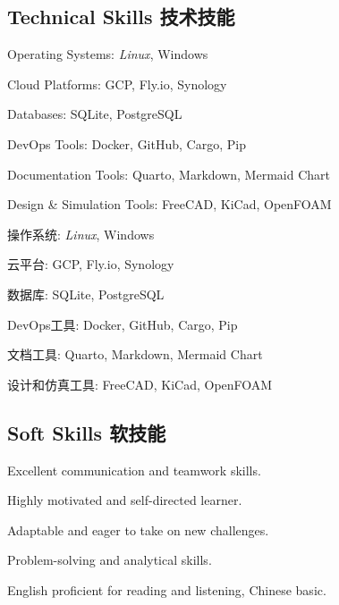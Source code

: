 \documentclass[
]
{article}
\providecommand{\tightlist}{%
  \setlength{\itemsep}{0pt}\setlength{\parskip}{0pt}}
\renewenvironment{itemize}{
  \begin{list}{}{
    \setlength{\leftmargin}{1.5em}
  }
}{
  \end{list}
}
\begin{document}
\subsection{Technical Skills \textbar{}
技术技能}\label{technical-skills-ux6280ux672fux6280ux80fd}

\begin{itemize}
\tightlist
\item
  Operating Systems: \emph{Linux}, Windows
\item
  Cloud Platforms: GCP, Fly.io, Synology
\item
  Databases: SQLite, PostgreSQL
\item
  DevOps Tools: Docker, GitHub, Cargo, Pip
\item
  Documentation Tools: Quarto, Markdown, Mermaid Chart
\item
  Design \& Simulation Tools: FreeCAD, KiCad, OpenFOAM
\end{itemize}

\begin{figure*}

\begin{itemize}
\tightlist
\item
  操作系统: \emph{Linux}, Windows
\item
  云平台: GCP, Fly.io, Synology
\item
  数据库: SQLite, PostgreSQL
\item
  DevOps工具: Docker, GitHub, Cargo, Pip
\item
  文档工具: Quarto, Markdown, Mermaid Chart
\item
  设计和仿真工具: FreeCAD, KiCad, OpenFOAM
\end{itemize}

\end{figure*}%

\subsection{Soft Skills \textbar{}
软技能}\label{soft-skills-ux8f6fux6280ux80fd}

\begin{itemize}
\tightlist
\item
  Excellent communication and teamwork skills.
\item
  Highly motivated and self-directed learner.
\item
  Adaptable and eager to take on new challenges.
\item
  Problem-solving and analytical skills.
\item
  English proficient for reading and listening, Chinese basic.
\end{itemize}
\end{document}
